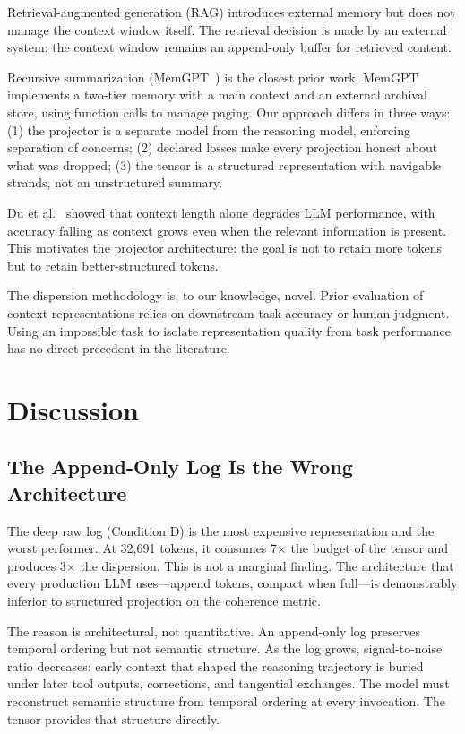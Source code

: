 \documentclass[11pt]{article}
\begin{document}
Retrieval-augmented generation (RAG) introduces external
memory but does not manage the context window itself. The retrieval
decision is made by an external system; the context window remains
an append-only buffer for retrieved content.

Recursive summarization (MemGPT~\cite{packer2023memgpt}) is the
closest prior work. MemGPT implements a two-tier memory with a main
context and an external archival store, using function calls to manage
paging. Our approach differs in three ways: (1) the projector is a
separate model from the reasoning model, enforcing separation of
concerns; (2) declared losses make every projection honest about what
was dropped; (3) the tensor is a structured representation with
navigable strands, not an unstructured summary.

Du et al.~\cite{du2025context} showed that context length alone
degrades LLM performance, with accuracy falling as context grows even
when the relevant information is present. This motivates the projector
architecture: the goal is not to retain more tokens but to retain
better-structured tokens.

The dispersion methodology is, to our knowledge, novel. Prior
evaluation of context representations relies on downstream task
accuracy or human judgment. Using an impossible task to isolate
representation quality from task performance has no direct precedent
in the literature.

\section{Discussion}

\subsection{The Append-Only Log Is the Wrong Architecture}

The deep raw log (Condition D) is the most expensive representation
and the worst performer. At 32,691 tokens, it consumes 7$\times$ the
budget of the tensor and produces 3$\times$ the dispersion. This is
not a marginal finding. The architecture that every production LLM
uses---append tokens, compact when full---is demonstrably inferior
to structured projection on the coherence metric.

The reason is architectural, not quantitative. An append-only log
preserves temporal ordering but not semantic structure. As the
log grows, signal-to-noise ratio decreases: early context that shaped
the reasoning trajectory is buried under later tool outputs,
corrections, and tangential exchanges. The model must reconstruct
semantic structure from temporal ordering at every invocation. The
tensor provides that structure directly.
\end{document}
